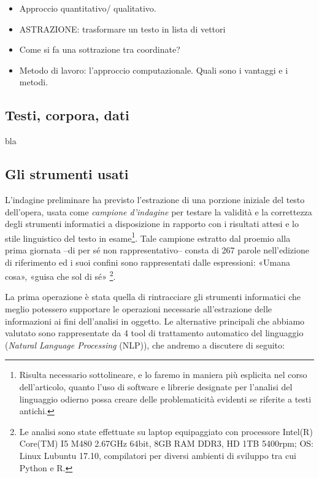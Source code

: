 \begin{itemize}
\tightlist
\item
  Approccio quantitativo/ qualitativo.
\item
  ASTRAZIONE: trasformare un testo in lista di vettori
\item
  Come si fa una sottrazione tra coordinate?
\item
  Metodo di lavoro: l'approccio computazionale. Quali sono i vantaggi e
  i metodi.
\end{itemize}

\subsection{Testi, corpora, dati}\label{testi-corpora-dati}

\autocite{owens2011}

bla

\autocite{moretti2005}

\subsection{Gli strumenti usati}\label{gli-strumenti-usati}

L'indagine preliminare ha previsto l'estrazione di una porzione iniziale
del testo dell'opera, usata come \emph{campione d'indagine} per testare
la validità e la correttezza degli strumenti informatici a disposizione
in rapporto con i risultati attesi e lo stile linguistico del testo in
esame\footnote{Risulta necessario sottolineare, e lo faremo in maniera
  più esplicita nel corso dell'articolo, quanto l'uso di software e
  librerie designate per l'analisi del linguaggio odierno possa creare
  delle problematicità evidenti se riferite a testi antichi.}. Tale
campione estratto dal proemio alla prima giornata --di per sé non
rappresentativo-- consta di 267 parole nell'edizione di riferimento ed i
suoi confini sono rappresentati dalle espressioni: «Umana cosa», «guisa
che sol di sé» \footnote{Le analisi sono state effettuate su laptop
  equipaggiato con processore Intel(R) Core(TM) I5 M480 2.67GHz 64bit,
  8GB RAM DDR3, HD 1TB 5400rpm; OS: Linux Lubuntu 17.10, compilatori per
  diversi ambienti di sviluppo tra cui Python e R.}.

La prima operazione è stata quella di rintracciare gli strumenti
informatici che meglio potessero supportare le operazioni necessarie
all'estrazione delle informazioni ai fini dell'analisi in oggetto. Le
alternative principali che abbiamo valutato sono rappresentate da 4 tool
di trattamento automatico del linguaggio (\emph{Natural Language
Processing} (NLP)), che andremo a discutere di seguito:

